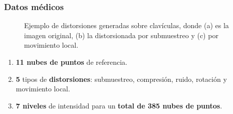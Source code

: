 \begin{frame}
  \frametitle{Datos médicos}
  \vspace{-1cm}
    \begin{figure}[htp]
      \caption{Ejemplo de distorsiones generadas sobre clavículas, donde (a) es la imagen original, 
      (b) la distorsionada por submuestreo y (c) por movimiento local.}
      \label{fig:DistorsionesGeneradas}
    \end{figure}
  \vspace{-.3cm}
    \begin{enumerate}
      \item \textbf{11 nubes de puntos} de referencia.  
      \item \textbf{5} tipos de \textbf{distorsiones}: 
        submuestreo, compresión, ruido, rotación y movimiento local.
      \item \textbf{7 niveles} de intensidad para un \textbf{total de 385 nubes de puntos}.
    \end{enumerate}
\end{frame}

